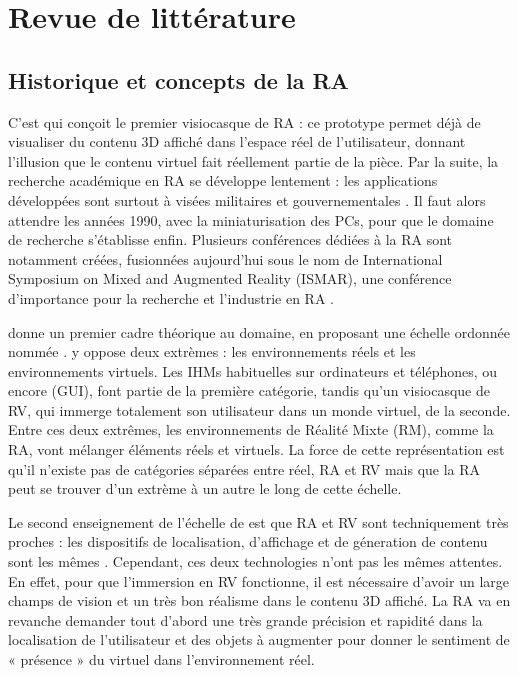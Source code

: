 \chapter{Revue de littérature}
\label{ch:litterature}

\section{Historique et concepts de la RA}
C'est \cite{Sutherland1968} qui conçoit le premier visiocasque de RA  : ce prototype permet déjà de visualiser du contenu 3D affiché dans l'espace réel de l'utilisateur, donnant l'illusion que le contenu virtuel fait réellement partie de la pièce. Par la suite, la recherche académique en RA se développe lentement : les applications développées sont surtout à visées militaires et gouvernementales \citep{VanKrevelen2010}. Il faut alors attendre les années 1990, avec la miniaturisation des PCs, pour que le domaine de recherche s'établisse enfin. Plusieurs conférences dédiées à la RA sont notamment créées, fusionnées aujourd'hui sous le nom de International Symposium on Mixed and Augmented Reality (ISMAR), une conférence d'importance pour la recherche et l'industrie en RA \citep{Azuma2001}.


\cite{Milgram1994} donne un premier cadre théorique au domaine, en proposant une échelle ordonnée nommée  . \citeauthor{Milgram1994} y oppose deux extrèmes : les environnements réels et les environnements virtuels. Les IHMs habituelles sur ordinateurs et téléphones, ou encore  (GUI), font partie de la première catégorie, tandis qu'un visiocasque de RV, qui immerge totalement son utilisateur dans un monde virtuel, de la seconde. Entre ces deux extrêmes, les environnements de Réalité Mixte (RM), comme la RA, vont mélanger éléments réels et virtuels. La force de cette représentation est qu'il n'existe pas de catégories séparées entre réel, RA et RV mais que la RA peut se trouver d'un extrème à un autre le long de cette échelle.

Le second enseignement de l'échelle de \citeauthor{Milgram1994} est que RA et RV sont techniquement très proches : les dispositifs de localisation, d'affichage et de géneration de contenu sont les mêmes \citep{Billinghurst2015}. Cependant, ces deux technologies n'ont pas les mêmes attentes. En effet, pour que l'immersion en RV fonctionne, il est nécessaire d'avoir un large champs de vision et un très bon réalisme dans le contenu 3D affiché. La RA va en revanche demander tout d'abord une très grande précision et rapidité dans la localisation de l'utilisateur et des objets à augmenter pour donner le sentiment de « présence » du virtuel dans l'environnement réel.

